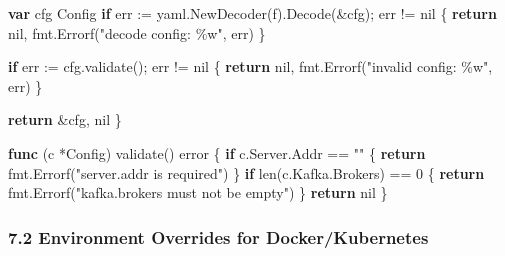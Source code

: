 \documentclass[
]{article}
\newenvironment{Shaded}{}{}
\newcommand{\BuiltInTok}[1]{\textcolor[rgb]{0.00,0.50,0.00}{#1}}
\newcommand{\ControlFlowTok}[1]{\textcolor[rgb]{0.00,0.44,0.13}{\textbf{#1}}}
\newcommand{\DataTypeTok}[1]{\textcolor[rgb]{0.56,0.13,0.00}{#1}}
\newcommand{\DecValTok}[1]{\textcolor[rgb]{0.25,0.63,0.44}{#1}}
\newcommand{\KeywordTok}[1]{\textcolor[rgb]{0.00,0.44,0.13}{\textbf{#1}}}
\newcommand{\NormalTok}[1]{#1}
\newcommand{\OperatorTok}[1]{\textcolor[rgb]{0.40,0.40,0.40}{#1}}
\newcommand{\OtherTok}[1]{\textcolor[rgb]{0.00,0.44,0.13}{#1}}
\newcommand{\StringTok}[1]{\textcolor[rgb]{0.25,0.44,0.63}{#1}}
\begin{document}
\begin{Shaded}
\begin{Highlighting}[]
    \KeywordTok{var}\NormalTok{ cfg Config}
    \ControlFlowTok{if}\NormalTok{ err }\OperatorTok{:=}\NormalTok{ yaml}\OperatorTok{.}\NormalTok{NewDecoder}\OperatorTok{(}\NormalTok{f}\OperatorTok{).}\NormalTok{Decode}\OperatorTok{(\&}\NormalTok{cfg}\OperatorTok{);}\NormalTok{ err }\OperatorTok{!=} \OtherTok{nil} \OperatorTok{\{}
        \ControlFlowTok{return} \OtherTok{nil}\OperatorTok{,}\NormalTok{ fmt}\OperatorTok{.}\NormalTok{Errorf}\OperatorTok{(}\StringTok{"decode config: \%w"}\OperatorTok{,}\NormalTok{ err}\OperatorTok{)}
    \OperatorTok{\}}

    \ControlFlowTok{if}\NormalTok{ err }\OperatorTok{:=}\NormalTok{ cfg}\OperatorTok{.}\NormalTok{validate}\OperatorTok{();}\NormalTok{ err }\OperatorTok{!=} \OtherTok{nil} \OperatorTok{\{}
        \ControlFlowTok{return} \OtherTok{nil}\OperatorTok{,}\NormalTok{ fmt}\OperatorTok{.}\NormalTok{Errorf}\OperatorTok{(}\StringTok{"invalid config: \%w"}\OperatorTok{,}\NormalTok{ err}\OperatorTok{)}
    \OperatorTok{\}}

    \ControlFlowTok{return} \OperatorTok{\&}\NormalTok{cfg}\OperatorTok{,} \OtherTok{nil}
\OperatorTok{\}}

\KeywordTok{func} \OperatorTok{(}\NormalTok{c }\OperatorTok{*}\NormalTok{Config}\OperatorTok{)}\NormalTok{ validate}\OperatorTok{()} \DataTypeTok{error} \OperatorTok{\{}
    \ControlFlowTok{if}\NormalTok{ c}\OperatorTok{.}\NormalTok{Server}\OperatorTok{.}\NormalTok{Addr }\OperatorTok{==} \StringTok{""} \OperatorTok{\{}
        \ControlFlowTok{return}\NormalTok{ fmt}\OperatorTok{.}\NormalTok{Errorf}\OperatorTok{(}\StringTok{"server.addr is required"}\OperatorTok{)}
    \OperatorTok{\}}
    \ControlFlowTok{if} \BuiltInTok{len}\OperatorTok{(}\NormalTok{c}\OperatorTok{.}\NormalTok{Kafka}\OperatorTok{.}\NormalTok{Brokers}\OperatorTok{)} \OperatorTok{==} \DecValTok{0} \OperatorTok{\{}
        \ControlFlowTok{return}\NormalTok{ fmt}\OperatorTok{.}\NormalTok{Errorf}\OperatorTok{(}\StringTok{"kafka.brokers must not be empty"}\OperatorTok{)}
    \OperatorTok{\}}
    \ControlFlowTok{return} \OtherTok{nil}
\OperatorTok{\}}
\end{Highlighting}
\end{Shaded}

\hypertarget{environment-overrides-for-dockerkubernetes}{%
\subsubsection{7.2 Environment Overrides for
Docker/Kubernetes}\label{environment-overrides-for-dockerkubernetes}}
\end{document}
